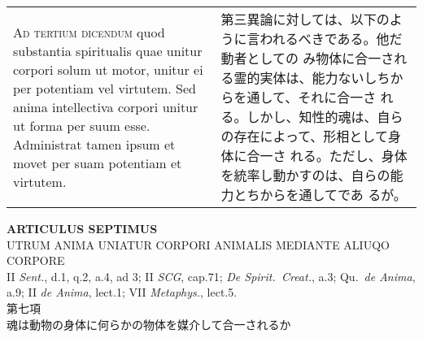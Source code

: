 \documentclass[paper=a4paper,fontsize=10pt,jafontsize=9pt,titlepage]{jlreq}
\begin{document}
\begin{longtable}{p{21em}p{21em}}
\\

{\scshape Ad tertium dicendum} quod substantia spiritualis quae unitur
corpori solum ut motor, unitur ei per potentiam vel virtutem. Sed
anima intellectiva corpori unitur ut forma per suum esse. Administrat
tamen ipsum et movet per suam potentiam et virtutem.

&

 第三異論に対しては、以下のように言われるべきである。他だ動者としての
 み物体に合一される霊的実体は、能力ないしちからを通して、それに合一さ
 れる。しかし、知性的魂は、自らの存在によって、形相として身体に合一さ
 れる。ただし、身体を統率し動かすのは、自らの能力とちからを通してであ
 るが。

\end{longtable}
\newpage



\begin{center}
{\Large {\bfseries ARTICULUS SEPTIMUS}}\\
{\large UTRUM ANIMA UNIATUR CORPORI ANIMALIS MEDIANTE ALIUQO CORPORE}\\
 {\footnotesize II {\itshape Sent.}, d.1, q.2, a.4, ad 3; II {\itshape SCG}, cap.71; {\itshape De Spirit.~Creat.}, a.3; Qu.~{\itshape de Anima}, a.9; II {\itshape de Anima}, lect.1; VII {\itshape Metaphys.}, lect.5.}\\
{\Large 第七項\\魂は動物の身体に何らかの物体を媒介して合一されるか}
\end{center}
\end{document}
